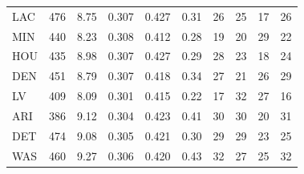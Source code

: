 \begin{tabular}{lrllllrrrr}
LAC & 476 & 8.75 & 0.307 & 0.427 & 0.31 & 26 & 25 & 17 & 26 \\
MIN & 440 & 8.23 & 0.308 & 0.412 & 0.28 & 19 & 20 & 29 & 22 \\
HOU & 435 & 8.98 & 0.307 & 0.427 & 0.29 & 28 & 23 & 18 & 24 \\
DEN & 451 & 8.79 & 0.307 & 0.418 & 0.34 & 27 & 21 & 26 & 29 \\
LV & 409 & 8.09 & 0.301 & 0.415 & 0.22 & 17 & 32 & 27 & 16 \\
ARI & 386 & 9.12 & 0.304 & 0.423 & 0.41 & 30 & 30 & 20 & 31 \\
DET & 474 & 9.08 & 0.305 & 0.421 & 0.30 & 29 & 29 & 23 & 25 \\
WAS & 460 & 9.27 & 0.306 & 0.420 & 0.43 & 32 & 27 & 25 & 32 \\
\bottomrule
\end{tabular}

